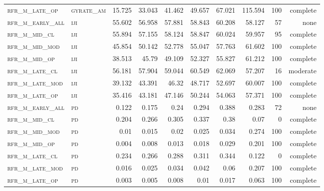 \begin{landscape}
\begin{center}
\begin{footnotesize}
\begin{longtable}{llrrrrr|rrr}
\textsc{rfr\_m\_late\_op  } & \textsc{gyrate\_am}   & 15.725  & 33.043  & 41.462  & 49.657   & 67.021   & 115.594 & 100 & complete \\
\textsc{rfr\_m\_early\_all} & \textsc{iji       }   & 55.602  & 56.958  & 57.881  & 58.843   & 60.208   & 58.127  & 57  & none     \\
\textsc{rfr\_m\_mid\_cl   } & \textsc{iji       }   & 55.894  & 57.155  & 58.124  & 58.847   & 60.024   & 59.957  & 95  & complete \\
\textsc{rfr\_m\_mid\_mod  } & \textsc{iji       }   & 45.854  & 50.142  & 52.778  & 55.047   & 57.763   & 61.602  & 100 & complete \\
\textsc{rfr\_m\_mid\_op   } & \textsc{iji       }   & 38.513  & 45.79   & 49.109  & 52.327   & 55.827   & 61.212  & 100 & complete \\
\textsc{rfr\_m\_late\_cl  } & \textsc{iji       }   & 56.181  & 57.904  & 59.044  & 60.549   & 62.069   & 57.207  & 16  & moderate \\
\textsc{rfr\_m\_late\_mod } & \textsc{iji       }   & 39.132  & 43.391  & 46.32   & 48.717   & 52.697   & 60.007  & 100 & complete \\
\textsc{rfr\_m\_late\_op  } & \textsc{iji       }   & 35.416  & 43.181  & 47.146  & 50.244   & 54.063   & 57.371  & 100 & complete \\
\textsc{rfr\_m\_early\_all} & \textsc{pd        }   & 0.122   & 0.175   & 0.24    & 0.294    & 0.388    & 0.283   & 72  & none     \\
\textsc{rfr\_m\_mid\_cl   } & \textsc{pd        }   & 0.204   & 0.266   & 0.305   & 0.337    & 0.38     & 0.07    & 0   & complete \\
\textsc{rfr\_m\_mid\_mod  } & \textsc{pd        }   & 0.01    & 0.015   & 0.02    & 0.025    & 0.034    & 0.274   & 100 & complete \\
\textsc{rfr\_m\_mid\_op   } & \textsc{pd        }   & 0.004   & 0.008   & 0.013   & 0.018    & 0.029    & 0.201   & 100 & complete \\
\textsc{rfr\_m\_late\_cl  } & \textsc{pd        }   & 0.234   & 0.266   & 0.288   & 0.311    & 0.344    & 0.122   & 0   & complete \\
\textsc{rfr\_m\_late\_mod } & \textsc{pd        }   & 0.016   & 0.025   & 0.034   & 0.042    & 0.06     & 0.207   & 100 & complete \\
\textsc{rfr\_m\_late\_op  } & \textsc{pd        }   & 0.003   & 0.005   & 0.008   & 0.01     & 0.017    & 0.063   & 100 & complete \\

\end{longtable}
\end{footnotesize}
\end{center}
\end{landscape}
